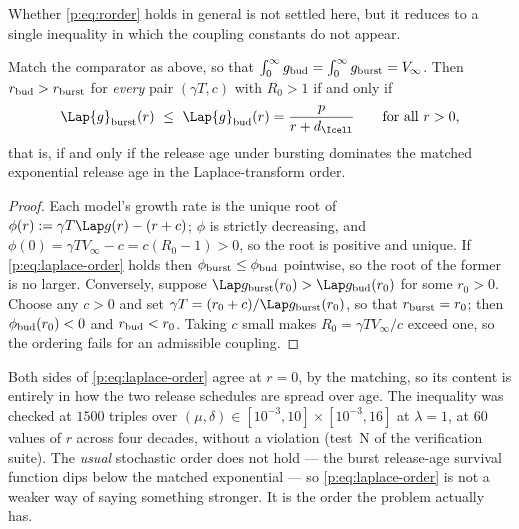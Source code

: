 Whether \cref{p:eq:rorder} holds in general is not settled here, but it
reduces to a single inequality in which the coupling constants do not appear.

\begin{proposition}
\label{p:prop:rorder}
Match the comparator as above, so that
$\int_0^\infty g_{\rm bud}=\int_0^\infty g_{\rm burst}=V_\infty$. Then
$r_{\rm bud}>r_{\rm burst}$ for \emph{every} pair $(\gamma T,c)$ with
$R_0>1$ if and only if
\begin{equation}
\Lap{g}_{\rm burst}(r)\ \le\ \Lap{g}_{\rm bud}(r)=\frac{p}{r+d_{\Icell}}
\qquad\text{for all }r>0,
\label{p:eq:laplace-order}
\end{equation}
that is, if and only if the release age under bursting dominates the matched
exponential release age in the Laplace-transform order.
\end{proposition}

\begin{proof}
Each model's growth rate is the unique root of
$\phi(r):=\gamma T\Lap g(r)-(r+c)$; $\phi$ is strictly decreasing, and
$\phi(0)=\gamma TV_\infty-c=c(R_0-1)>0$, so the root is positive and unique.
If \cref{p:eq:laplace-order} holds then $\phi_{\rm burst}\le\phi_{\rm bud}$
pointwise, so the root of the former is no larger. Conversely, suppose
$\Lap g_{\rm burst}(r_0)>\Lap g_{\rm bud}(r_0)$ for some $r_0>0$. Choose any
$c>0$ and set $\gamma T=(r_0+c)/\Lap g_{\rm burst}(r_0)$, so that
$r_{\rm burst}=r_0$; then $\phi_{\rm bud}(r_0)<0$ and $r_{\rm bud}<r_0$.
Taking $c$ small makes $R_0=\gamma TV_\infty/c$ exceed one, so the ordering
fails for an admissible coupling.
\end{proof}

\noindent
Both sides of \cref{p:eq:laplace-order} agree at $r=0$, by the matching, so
its content is entirely in how the two release schedules are spread over
age. The inequality was checked at $1500$ triples over
$(\mu,\delta)\in[10^{-3},10]\times[10^{-3},16]$ at $\lambda=1$, at $60$
values of $r$ across four decades, without a violation
(test~N of the verification suite). The \emph{usual} stochastic order does
not hold --- the burst release-age survival function dips below the matched
exponential --- so \cref{p:eq:laplace-order} is not a weaker way of saying
something stronger. It is the order the problem actually has.

